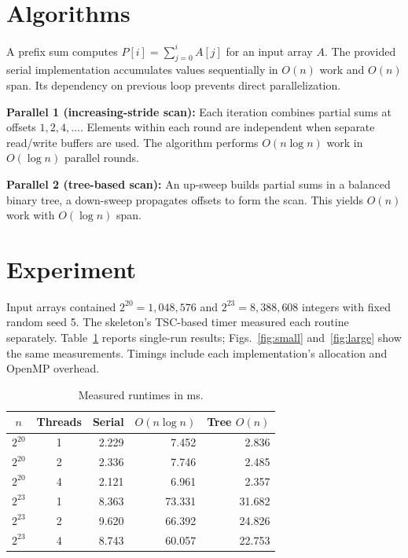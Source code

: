 \documentclass[11pt,letterpaper,twocolumn]{article}
\begin{document}
\section*{Algorithms}
A prefix sum computes $P[i]=\sum_{j=0}^{i}A[j]$ for an input array $A$.
The provided serial implementation accumulates values sequentially in $O(n)$ work and $O(n)$ span. Its dependency on previous loop prevents direct parallelization.

\textbf{Parallel 1 (increasing-stride scan):} Each iteration combines partial sums at offsets $1,2,4,\ldots$. Elements within each round are independent when separate read/write buffers are used. The algorithm performs $O(n\log n)$ work in $O(\log n)$ parallel rounds.

\textbf{Parallel 2 (tree-based scan):} An up-sweep builds partial sums in a balanced binary tree, a down-sweep propagates offsets to form the scan. This yields $O(n)$ work with $O(\log n)$ span. 

\section*{Experiment}
Input arrays contained $2^{20}=1{,}048{,}576$ and $2^{23}=8{,}388{,}608$ integers with fixed random seed 5. The skeleton's TSC-based timer measured each routine separately. Table~\ref{tab:times} reports single-run results; Figs.~\ref{fig:small} and~\ref{fig:large} show the same measurements. Timings include each implementation's allocation and OpenMP overhead.

\begin{table}[H]
\centering
\caption{Measured runtimes in ms.}
\label{tab:times}
\setlength{\tabcolsep}{4pt}
\footnotesize
\begin{tabular}{@{}ccrrr@{}}
\toprule
$n$ & Threads & Serial & $O(n\log n)$ & Tree $O(n)$ \\
\midrule
$2^{20}$ & 1 & 2.229 & 7.452 & 2.836 \\
$2^{20}$ & 2 & 2.336 & 7.746 & 2.485 \\
$2^{20}$ & 4 & 2.121 & 6.961 & 2.357 \\
$2^{23}$ & 1 & 8.363 & 73.331 & 31.682 \\
$2^{23}$ & 2 & 9.620 & 66.392 & 24.826 \\
$2^{23}$ & 4 & 8.743 & 60.057 & 22.753 \\
\bottomrule
\end{tabular}
\end{table}
\end{document}
